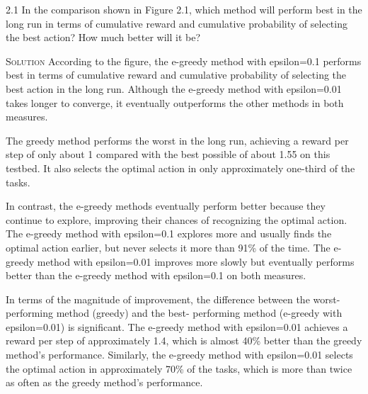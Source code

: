 \documentclass{article}
\begin{document}
2.1 In the comparison shown in Figure 2.1, which method will 
perform best in the long run in terms of cumulative reward and 
cumulative probability of selecting the best action? How 
much better will it be?

\textsc{Solution} According to the figure, the e-greedy method with 
epsilon=0.1 performs best in terms of cumulative reward and 
cumulative probability of selecting the best action in the 
long run. Although the e-greedy method with epsilon=0.01 takes 
longer to converge, it eventually outperforms the other methods in 
both measures.

The greedy method performs the worst in the long run, achieving a 
reward per step of only about 1 compared with the best possible of 
about 1.55 on this testbed. It also selects the optimal action in 
only approximately one-third of the tasks.

In contrast, the e-greedy methods eventually perform better because 
they continue to explore, improving their chances of 
recognizing the optimal action. The e-greedy method with 
epsilon=0.1 explores more and usually finds the optimal action 
earlier, but never selects it more than 91\% of the time. The 
e-greedy method with epsilon=0.01 improves more slowly but 
eventually performs better than the e-greedy method with 
epsilon=0.1 on both measures.

In terms of the magnitude of improvement, the difference 
between the worst-performing method (greedy) and the best-
performing method (e-greedy with epsilon=0.01) is significant. The 
e-greedy method with epsilon=0.01 achieves a reward per step of 
approximately 1.4, which is almost 40\% better than the greedy 
method's performance. Similarly, the e-greedy method with 
epsilon=0.01 selects the optimal action in approximately 70\% of 
the tasks, which is more than twice as often as the greedy 
method's performance.
\end{document}
